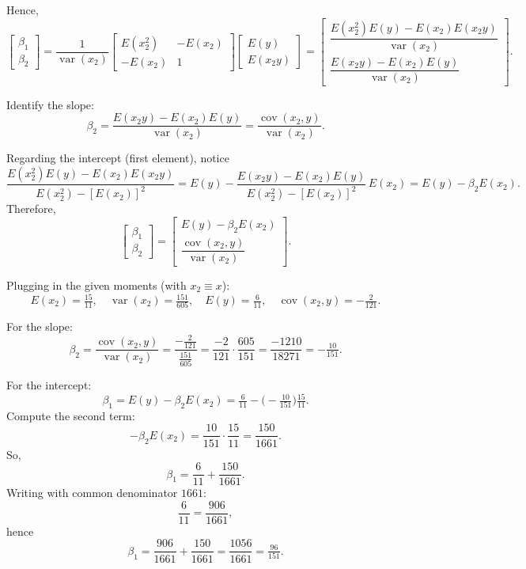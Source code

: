 \documentclass[12pt,a4paper]{article}
\begin{document}
Hence,
\[
\begin{bmatrix}
\beta_1\\ \beta_2
\end{bmatrix}
=
\frac{1}{\operatorname{var}(x_2)}
\begin{bmatrix}
E(x_2^2) & -E(x_2)\\
- E(x_2) & 1
\end{bmatrix}
\begin{bmatrix}
E(y)\\
E(x_2y)
\end{bmatrix}
=
\begin{bmatrix}
\dfrac{E(x_2^2)E(y)-E(x_2)E(x_2y)}{\operatorname{var}(x_2)}\\[10pt]
\dfrac{E(x_2y)-E(x_2)E(y)}{\operatorname{var}(x_2)}
\end{bmatrix}.
\]

Identify the slope:
\[
\beta_2=\frac{E(x_2y)-E(x_2)E(y)}{\operatorname{var}(x_2)}
=\frac{\operatorname{cov}(x_2,y)}{\operatorname{var}(x_2)}.
\]

Regarding the intercept (first element), notice
\[
\frac{E(x_2^2)E(y)-E(x_2)E(x_2y)}{E(x_2^2)-[E(x_2)]^2}
=
E(y)-\frac{E(x_2y)-E(x_2)E(y)}{E(x_2^2)-[E(x_2)]^2}\,E(x_2)
=E(y)-\beta_2E(x_2).
\]
Therefore,
\[
\begin{bmatrix}
\beta_1\\ \beta_2
\end{bmatrix}
=
\begin{bmatrix}
E(y)-\beta_2E(x_2)\\[4pt]
\dfrac{\operatorname{cov}(x_2,y)}{\operatorname{var}(x_2)}
\end{bmatrix}.
\]

Plugging in the given moments (with $x_2\equiv x$):
\[
E(x_2)=\tfrac{15}{11},\quad 
\operatorname{var}(x_2)=\tfrac{151}{605},\quad 
E(y)=\tfrac{6}{11},\quad 
\operatorname{cov}(x_2,y)=-\tfrac{2}{121}.
\]

For the slope:
\[
\beta_2=\frac{\operatorname{cov}(x_2,y)}{\operatorname{var}(x_2)}
=\frac{-\tfrac{2}{121}}{\tfrac{151}{605}}
=\frac{-2}{121}\cdot \frac{605}{151}
=\frac{-1210}{18271}
=-\tfrac{10}{151}.
\]

For the intercept:
\[
\beta_1=E(y)-\beta_2E(x_2)
=\tfrac{6}{11}-\Big(-\tfrac{10}{151}\Big)\tfrac{15}{11}.
\]
Compute the second term:
\[
-\beta_2E(x_2)
=\frac{10}{151}\cdot\frac{15}{11}
=\frac{150}{1661}.
\]
So,
\[
\beta_1=\frac{6}{11}+\frac{150}{1661}.
\]
Writing with common denominator $1661$:
\[
\frac{6}{11}=\frac{906}{1661},
\]
hence
\[
\beta_1=\frac{906}{1661}+\frac{150}{1661}
=\frac{1056}{1661}
=\tfrac{96}{151}.
\]
\end{document}
